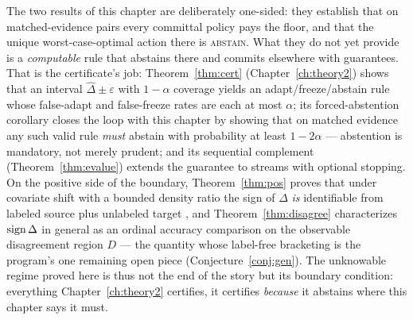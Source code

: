 \begin{remark}\label{rem:t1-buys}
The two results of this chapter are deliberately one-sided: they establish
that on matched-evidence pairs every committal policy pays the floor, and
that the unique worst-case-optimal action there is \textsc{abstain}. What
they do not yet provide is a \emph{computable} rule that abstains there
and commits elsewhere with guarantees. That is the certificate's job:
Theorem~\ref{thm:cert} (Chapter~\ref{ch:theory2}) shows that an interval
$\widehat\Delta\pm\varepsilon$ with $1-\alpha$ coverage yields an
adapt/freeze/abstain rule whose false-adapt and false-freeze rates are
each at most $\alpha$; its forced-abstention corollary closes the loop
with this chapter by showing that on matched evidence any such valid rule
\emph{must} abstain with probability at least $1-2\alpha$ --- abstention
is mandatory, not merely prudent; and its sequential complement
(Theorem~\ref{thm:evalue}) extends the guarantee to streams with optional
stopping. On the positive side of the boundary,
Theorem~\ref{thm:pos} proves that under covariate shift with a bounded
density ratio the sign of $\Delta$ \emph{is} identifiable from labeled
source plus unlabeled target \cite{shimodaira2000improving}, and
Theorem~\ref{thm:disagree} characterizes $\operatorname{sign}\Delta$ in general as an
ordinal accuracy comparison on the observable disagreement region $D$ ---
the quantity whose label-free bracketing is the program's one remaining
open piece (Conjecture~\ref{conj:gen}). The unknowable regime proved here
is thus not the end of the story but its boundary condition: everything
Chapter~\ref{ch:theory2} certifies, it certifies \emph{because} it
abstains where this chapter says it must.
\end{remark}

